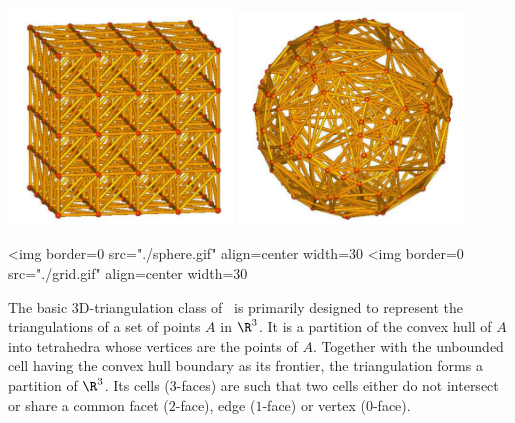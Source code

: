 %


\begin{ccTexOnly}
\begin{center}
\includegraphics[width=6cm]{Triangulation_3/grid} \hspace*{2cm} 
\includegraphics[width=6cm]{Triangulation_3/sphere} 
\end{center}
\end{ccTexOnly}
\begin{ccHtmlOnly}
<img border=0 src="./sphere.gif" align=center width=30%
<img border=0 src="./grid.gif" align=center width=30%
\end{ccHtmlOnly}

The basic 3D-triangulation class of \cgal\ is primarily designed to
represent the triangulations of a set of points $A$ in $\R^3$.  It is
a partition of the convex hull of {$A$} into tetrahedra whose vertices
are the points of {$A$}.  Together with the unbounded cell having the
convex hull boundary as its frontier, the triangulation forms a
partition of $\R^3$. Its cells ($3$-faces) are such that two cells
either do not intersect or share a common facet ($2$-face), edge
($1$-face) or vertex ($0$-face).

